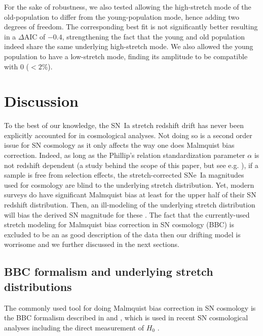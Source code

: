 \documentclass[]{aa} %
\begin{document}
For the sake of robustness, we also tested allowing the high-stretch mode of the
old-population to differ from the young-population mode, hence adding two
degrees of freedom. The corresponding best fit is not significantly better
resulting in a $\Delta$AIC of $-0.4$, strengthening the fact that the young and
old population indeed share the same underlying high-stretch mode. We also
allowed the young population to have a low-stretch mode, finding its amplitude
to be compatible with 0 ($<2\%$).

\section{Discussion}\label{sec:discussion}

To the best of our knowledge, the SN~Ia stretch redshift drift has never been
explicitly accounted for in cosmological analyses. Not doing so is a second
order issue for SN cosmology as it only affects the way one does Malmquist bias
correction.  Indeed, as long as the Phillip's relation standardization parameter
$\alpha$ is not redshift dependent (a study behind the scope of this paper, but
see e.g. \citealt{scolnic2018a}), if a sample is free from selection effects,
the stretch-corrected SNe~Ia magnitudes used for cosmology are blind to the
underlying stretch distribution. Yet, modern surveys do have significant
Malmquist bias at least for the upper half of their SN redshift distribution.
Then, an ill-modeling of the underlying stretch distribution will bias the
derived SN magnitude for these \citep[see e.g.,][]{rubin2015,rubin2016}. The
fact that the currently-used stretch modeling for Malmquist bias correction in
SN cosmology (BBC) is excluded to be an as good description of the data then our
drifting model is worrisome and we further discussed in the next sections.

\subsection{BBC formalism and underlying stretch distributions}\label{sec:bbc}

The commonly used tool for doing Malmquist bias correction in SN cosmology is
the BBC formalism described in \cite{scolnic2016} and \cite{kessler2017}, which
is used in recent SN cosmological analyses \citep{jones2018b, scolnic2018a,
brout2019, descosmopaper2019} including the direct measurement of $H_0$
\citep{riess2016,riess2019}.
\end{document}
